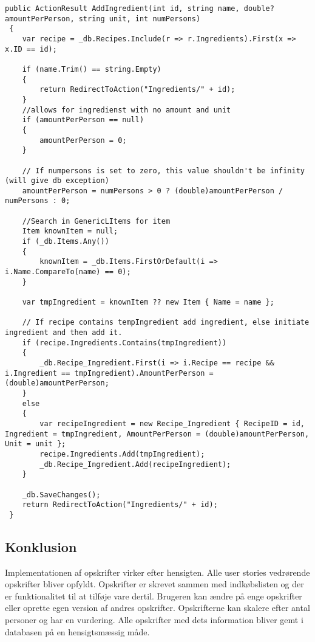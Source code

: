 \begin{lstlisting}[caption="AddIngredient som opretter og tilføjer ingredienser til en specifik opskrift"]
 public ActionResult AddIngredient(int id, string name, double? amountPerPerson, string unit, int numPersons)
 {
 	var recipe = _db.Recipes.Include(r => r.Ingredients).First(x => x.ID == id);
 	
 	if (name.Trim() == string.Empty)
 	{
 		return RedirectToAction("Ingredients/" + id);
 	}
 	//allows for ingredienst with no amount and unit
 	if (amountPerPerson == null)
 	{
 		amountPerPerson = 0;
 	}
 	
 	// If numpersons is set to zero, this value shouldn't be infinity (will give db exception)
 	amountPerPerson = numPersons > 0 ? (double)amountPerPerson / numPersons : 0;
 	
 	//Search in GenericLItems for item
 	Item knownItem = null;
 	if (_db.Items.Any())
 	{
 		knownItem = _db.Items.FirstOrDefault(i => i.Name.CompareTo(name) == 0);
 	}
 	
 	var tmpIngredient = knownItem ?? new Item { Name = name };
 	
 	// If recipe contains tempIngredient add ingredient, else initiate ingredient and then add it.
 	if (recipe.Ingredients.Contains(tmpIngredient))
 	{
 		_db.Recipe_Ingredient.First(i => i.Recipe == recipe && i.Ingredient == tmpIngredient).AmountPerPerson = (double)amountPerPerson;
 	}
 	else
 	{
 		var recipeIngredient = new Recipe_Ingredient { RecipeID = id, Ingredient = tmpIngredient, AmountPerPerson = (double)amountPerPerson, Unit = unit };
 		recipe.Ingredients.Add(tmpIngredient);
 		_db.Recipe_Ingredient.Add(recipeIngredient);
 	}
 	
 	_db.SaveChanges();
 	return RedirectToAction("Ingredients/" + id);
 }
\end{lstlisting}


\subsection{Konklusion}
Implementationen af opskrifter virker efter hensigten. 
Alle user stories vedrørende opskrifter bliver opfyldt. 
Opskrifter er skrevet sammen med indkøbslisten og der er funktionalitet til at tilføje vare dertil. Brugeren kan ændre på enge opskrifter eller oprette egen version af andres opskrifter. 
Opskrifterne kan skalere efter antal personer og har en vurdering. 
Alle opskrifter med dets information bliver gemt i databasen på en hensigtsmæssig måde.

